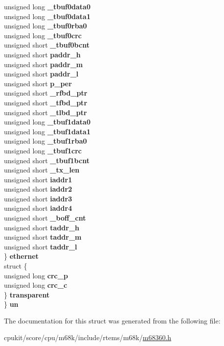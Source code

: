 \begin{DoxyCompactItemize}
\begin{tabbing}
\>\>unsigned long {\bfseries \_tbuf0data0}\\
\>\>unsigned long {\bfseries \_tbuf0data1}\\
\>\>unsigned long {\bfseries \_tbuf0rba0}\\
\>\>unsigned long {\bfseries \_tbuf0crc}\\
\>\>unsigned short {\bfseries \_tbuf0bcnt}\\
\>\>unsigned short {\bfseries paddr\_h}\\
\>\>unsigned short {\bfseries paddr\_m}\\
\>\>unsigned short {\bfseries paddr\_l}\\
\>\>unsigned short {\bfseries p\_per}\\
\>\>unsigned short {\bfseries \_rfbd\_ptr}\\
\>\>unsigned short {\bfseries \_tfbd\_ptr}\\
\>\>unsigned short {\bfseries \_tlbd\_ptr}\\
\>\>unsigned long {\bfseries \_tbuf1data0}\\
\>\>unsigned long {\bfseries \_tbuf1data1}\\
\>\>unsigned long {\bfseries \_tbuf1rba0}\\
\>\>unsigned long {\bfseries \_tbuf1crc}\\
\>\>unsigned short {\bfseries \_tbuf1bcnt}\\
\>\>unsigned short {\bfseries \_tx\_len}\\
\>\>unsigned short {\bfseries iaddr1}\\
\>\>unsigned short {\bfseries iaddr2}\\
\>\>unsigned short {\bfseries iaddr3}\\
\>\>unsigned short {\bfseries iaddr4}\\
\>\>unsigned short {\bfseries \_boff\_cnt}\\
\>\>unsigned short {\bfseries taddr\_h}\\
\>\>unsigned short {\bfseries taddr\_m}\\
\>\>unsigned short {\bfseries taddr\_l}\\
\>\} {\bfseries ethernet}\\
\>struct \{\\
\>\>unsigned long {\bfseries crc\_p}\\
\>\>unsigned long {\bfseries crc\_c}\\
\>\} {\bfseries transparent}\\
\} {\bfseries un}\\

\end{tabbing}\end{DoxyCompactItemize}


The documentation for this struct was generated from the following file\+:\begin{DoxyCompactItemize}
\item 
cpukit/score/cpu/m68k/include/rtems/m68k/\mbox{\hyperlink{m68360_8h}{m68360.\+h}}\end{DoxyCompactItemize}
